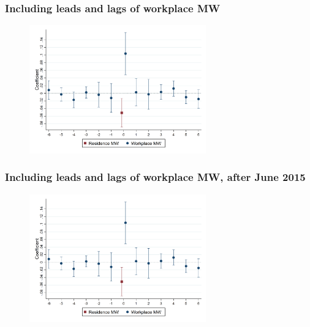 \documentclass[aspectratio=169, t]{beamer}
\begin{document}
\begin{frame}[label = dyn_baseline_plot]
    \frametitle{Including leads and lags of workplace MW}

    \begin{figure}
        \centering
        \includegraphics[width=0.68\textwidth]{fd_baseline/output/fd_both_mw_wkp_only_dynamic.png}
    \end{figure}
    
    \hyperlink{exclude_res}{}
    \hyperlink{res_only_dyn}{}
    \hyperlink{both_dyn}{}
\end{frame}

\begin{frame}[label = dyn_baseline_plot]
    \frametitle{Including leads and lags of workplace MW, after June 2015}

    \begin{figure}
        \centering
        \includegraphics[width=0.68\textwidth]{../../input/fd_both_mw_wkp_only_dynamic_fullbal.png}
    \end{figure}
    
\end{frame}
\end{document}
